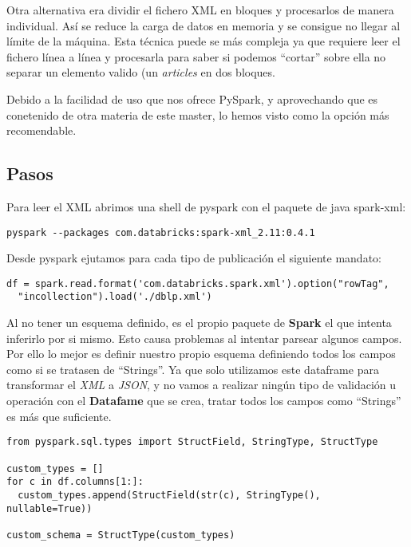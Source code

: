 Otra alternativa era dividir el fichero XML en bloques y procesarlos de manera individual. Así se reduce la carga de datos en memoria y se consigue no llegar al límite de la máquina. Esta técnica puede se más compleja ya que requiere leer el fichero línea a línea y procesarla para saber si podemos ``cortar'' sobre ella no separar un elemento valido (un \textit{articles} en dos bloques.

Debido a la facilidad de uso que nos ofrece PySpark, y aprovechando que es conetenido de otra materia de este master, lo hemos visto como la opción más recomendable.

\subsection{Pasos}

Para leer el XML abrimos una shell de pyspark con el paquete de java spark-xml:

\begin{verbatim}
pyspark --packages com.databricks:spark-xml_2.11:0.4.1
\end{verbatim}

Desde pyspark ejutamos para cada tipo de publicación el siguiente mandato:

\begin{verbatim}
df = spark.read.format('com.databricks.spark.xml').option("rowTag",
  "incollection").load('./dblp.xml')
\end{verbatim}

Al no tener un esquema definido, es el propio paquete de \textbf{Spark} el que intenta inferirlo por si mismo. Esto causa problemas al intentar parsear algunos campos. Por ello lo mejor es definir nuestro propio esquema definiendo todos los campos como si se tratasen de ``Strings''. Ya que solo utilizamos este dataframe para transformar el \textit{XML} a \textit{JSON}, y no vamos a realizar ningún tipo de validación u operación con el \textbf{Datafame} que se crea, tratar todos los campos como ``Strings'' es más que suficiente.

\begin{verbatim}
from pyspark.sql.types import StructField, StringType, StructType

custom_types = []
for c in df.columns[1:]:
  custom_types.append(StructField(str(c), StringType(), nullable=True))

custom_schema = StructType(custom_types)
\end{verbatim}

